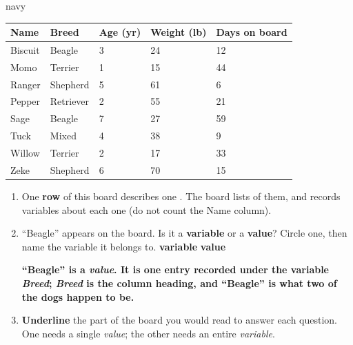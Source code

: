 \documentclass[10pt]{article}
\newcommand{\answerspace}[2]{\par\nopagebreak\noindent\begin{minipage}[t][#1][t]{\linewidth}%
  \color{keyred}\bfseries #2\end{minipage}\par}
\begin{document}
\boxguard[30]
\begin{scenariobox}{navy}
\small
\renewcommand{\arraystretch}{1.25}
\begin{tabularx}{\linewidth}{@{} l Y Y Y Y @{}}
\textbf{Name} & \textbf{Breed} & \textbf{Age (yr)} & \textbf{Weight (lb)} & \textbf{Days on board} \\
\hline
Biscuit & Beagle    & 3 & 24 & 12 \\
Momo    & Terrier   & 1 & 15 & 44 \\
Ranger  & Shepherd  & 5 & 61 &  6 \\
Pepper  & Retriever & 2 & 55 & 21 \\
Sage    & Beagle    & 7 & 27 & 59 \\
Tuck    & Mixed     & 4 & 38 &  9 \\
Willow  & Terrier   & 2 & 17 & 33 \\
Zeke    & Shepherd  & 6 & 70 & 15 \\
\hline
\end{tabularx}

\vspace{6pt}
\begin{enumerate}[label=\textbf{\alph*.}, leftmargin=1.8em, itemsep=7pt]
  \item One \textbf{row} of this board describes one . The board lists
         of them, and records  variables about each one
        (do not count the Name column).
  \item ``Beagle'' appears on the board. Is it a \textbf{variable} or a \textbf{value}?
        Circle one, then name the variable it belongs to.
        \hfill \textbf{variable} \qquad \textbf{value} 
        \answerspace{1.2cm}{``Beagle'' is a \emph{value}. It is one entry recorded under the
        variable \emph{Breed}; \emph{Breed} is the column heading, and ``Beagle'' is what two
        of the dogs happen to be.}
  \item \textbf{Underline} the part of the board you would read to answer each question. One
        needs a single \emph{value}; the other needs an entire \emph{variable}.


\end{enumerate}
\end{scenariobox}
\end{document}
